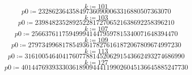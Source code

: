 \documentclass{article}
\begin{document}
\vspace{-\bigskipamount}
\begin{dmath*}
k \coloneqq 101
\end{dmath*}
\vspace{-\bigskipamount}
\begin{dmath*}
\mathit{p0} \coloneqq 232862364358497360900063316880507363070
\end{dmath*}
\vspace{-\bigskipamount}
\begin{dmath*}
k \coloneqq 103
\end{dmath*}
\vspace{-\bigskipamount}
\begin{dmath*}
\mathit{p0} \coloneqq 23984823528925228172706521638692258396210
\end{dmath*}
\vspace{-\bigskipamount}
\begin{dmath*}
k \coloneqq 107
\end{dmath*}
\vspace{-\bigskipamount}
\begin{dmath*}
\mathit{p0} \coloneqq 2566376117594999414479597815340071648394470
\end{dmath*}
\vspace{-\bigskipamount}
\begin{dmath*}
k \coloneqq 109
\end{dmath*}
\vspace{-\bigskipamount}
\begin{dmath*}
\mathit{p0} \coloneqq 279734996817854936178276161872067809674997230
\end{dmath*}
\vspace{-\bigskipamount}
\begin{dmath*}
k \coloneqq 113
\end{dmath*}
\vspace{-\bigskipamount}
\begin{dmath*}
\mathit{p0} \coloneqq 31610054640417607788145206291543662493274686990
\end{dmath*}
\vspace{-\bigskipamount}
\begin{dmath*}
k \coloneqq 127
\end{dmath*}
\vspace{-\bigskipamount}
\begin{dmath*}
\mathit{p0} \coloneqq 4014476939333036189094441199026045136645885247730
\end{dmath*}
\end{document}
